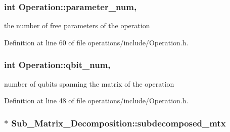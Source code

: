 \subsubsection[{\texorpdfstring{parameter\+\_\+num}{parameter_num}}]{\setlength{\rightskip}{0pt plus 5cm}int Operation\+::parameter\+\_\+num\hspace{0.3cm}{\ttfamily [protected]}, {\ttfamily [inherited]}}\hypertarget{class_operation_aa57505afe5b5ec27f6d053044b86e043}{}\label{class_operation_aa57505afe5b5ec27f6d053044b86e043}


the number of free parameters of the operation 



Definition at line 60 of file operations/include/\+Operation.\+h.

\subsubsection[{\texorpdfstring{qbit\+\_\+num}{qbit_num}}]{\setlength{\rightskip}{0pt plus 5cm}int Operation\+::qbit\+\_\+num\hspace{0.3cm}{\ttfamily [protected]}, {\ttfamily [inherited]}}\hypertarget{class_operation_aecd5fbf1dd4ea532b2e58471ff8bad69}{}\label{class_operation_aecd5fbf1dd4ea532b2e58471ff8bad69}


number of qubits spanning the matrix of the operation 



Definition at line 48 of file operations/include/\+Operation.\+h.

\subsubsection[{\texorpdfstring{subdecomposed\+\_\+mtx}{subdecomposed_mtx}}]{ $\ast$ Sub\+\_\+\+Matrix\+\_\+\+Decomposition\+::subdecomposed\+\_\+mtx}\hypertarget{class_sub___matrix___decomposition_a6287cd71e03f5677dce69c7341aa452c}{}\label{class_sub___matrix___decomposition_a6287cd71e03f5677dce69c7341aa452c}


